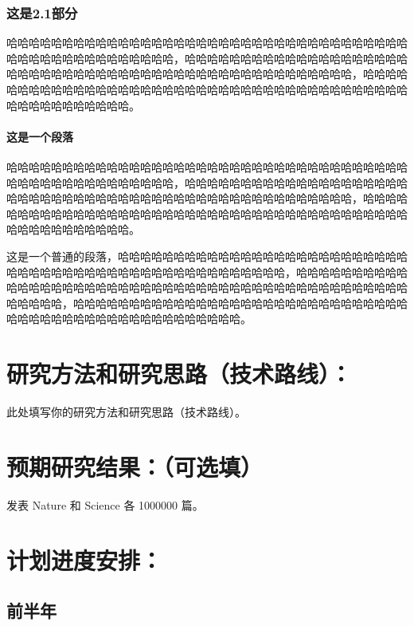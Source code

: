 \documentclass[a4paper,zihao=-4,AutoFakeBold,AutoFakeSlant]{ctexart}
\begin{document}
\subsubsection{这是2.1部分}

哈哈哈哈哈哈哈哈哈哈哈哈哈哈哈哈哈哈哈哈哈哈哈哈哈哈哈哈哈哈哈哈哈哈哈哈哈哈哈哈哈哈哈哈哈哈哈哈哈哈哈，哈哈哈哈哈哈哈哈哈哈哈哈哈哈哈哈哈哈哈哈哈哈哈哈哈哈哈哈哈哈哈哈哈哈哈哈哈哈哈哈哈哈哈哈哈哈哈哈哈哈哈，哈哈哈哈哈哈哈哈哈哈哈哈哈哈哈哈哈哈哈哈哈哈哈哈哈哈哈哈哈哈哈哈哈哈哈哈哈哈哈哈哈哈哈哈哈哈哈哈哈哈哈。

\paragraph{这是一个段落}

哈哈哈哈哈哈哈哈哈哈哈哈哈哈哈哈哈哈哈哈哈哈哈哈哈哈哈哈哈哈哈哈哈哈哈哈哈哈哈哈哈哈哈哈哈哈哈哈哈哈哈，哈哈哈哈哈哈哈哈哈哈哈哈哈哈哈哈哈哈哈哈哈哈哈哈哈哈哈哈哈哈哈哈哈哈哈哈哈哈哈哈哈哈哈哈哈哈哈哈哈哈哈，哈哈哈哈哈哈哈哈哈哈哈哈哈哈哈哈哈哈哈哈哈哈哈哈哈哈哈哈哈哈哈哈哈哈哈哈哈哈哈哈哈哈哈哈哈哈哈哈哈哈哈。

这是一个普通的段落，哈哈哈哈哈哈哈哈哈哈哈哈哈哈哈哈哈哈哈哈哈哈哈哈哈哈哈哈哈哈哈哈哈哈哈哈哈哈哈哈哈哈哈哈哈哈哈哈哈哈哈，哈哈哈哈哈哈哈哈哈哈哈哈哈哈哈哈哈哈哈哈哈哈哈哈哈哈哈哈哈哈哈哈哈哈哈哈哈哈哈哈哈哈哈哈哈哈哈哈哈哈哈，哈哈哈哈哈哈哈哈哈哈哈哈哈哈哈哈哈哈哈哈哈哈哈哈哈哈哈哈哈哈哈哈哈哈哈哈哈哈哈哈哈哈哈哈哈哈哈哈哈哈哈。


\section{研究方法和研究思路（技术路线）：}

此处填写你的研究方法和研究思路（技术路线）。


\section{预期研究结果：（可选填）}

发表 Nature 和 Science 各 1000000 篇。


\section{计划进度安排：}

\subsection{前半年}
\end{document}
